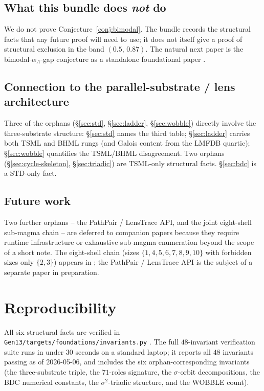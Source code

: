 \documentclass[11pt,reqno]{amsart}
\theoremstyle{plain}
\theoremstyle{definition}
\theoremstyle{remark}
\newcommand{\TSML}{\mathrm{TSML}}
\newcommand{\STD}{\mathrm{STD}}
\begin{document}
\subsection{What this bundle does \emph{not} do}
We do not prove Conjecture~\ref{conj:bimodal}. The bundle records the
structural facts that any future proof will need to use; it does not
itself give a proof of structural exclusion in the band
$(0.5,\,0.87)$. The natural next paper is the
bimodal-$\alpha_A$-gap conjecture as a standalone foundational paper
\cite{FamilyStructureV1}.

\subsection{Connection to the parallel-substrate / lens architecture}
Three of the orphans (\S\ref{sec:std}, \S\ref{sec:ladder},
\S\ref{sec:wobble}) directly involve the three-substrate structure:
\S\ref{sec:std} names the third table; \S\ref{sec:ladder} carries
both TSML and BHML rungs (and Galois content from the LMFDB
quartic); \S\ref{sec:wobble} quantifies the TSML/BHML disagreement.
Two orphans (\S\ref{sec:cycle-skeleton}, \S\ref{sec:triadic}) are
$\TSML$-only structural facts. \S\ref{sec:bdc} is a $\STD$-only
fact.

\subsection{Future work}
Two further orphans -- the PathPair / LensTrace API, and the
joint eight-shell sub-magma chain -- are deferred to companion
papers because they require runtime infrastructure or exhaustive
sub-magma enumeration beyond the scope of a short note. The
eight-shell chain (sizes $\{1,4,5,6,7,8,9,10\}$ with forbidden sizes
only $\{2,3\}$) appears in \cite{SandersGishFourCore}; the
PathPair / LensTrace API is the subject of a separate paper in
preparation.

\section{Reproducibility}\label{sec:repro}

All six structural facts are verified in
\texttt{Gen13/targets/foundations/invariants.py}
\cite{FoundationsModule}. The full $48$-invariant verification suite
runs in under $30$ seconds on a standard laptop; it reports all $48$
invariants passing as of 2026-05-06, and includes the six
orphan-corresponding invariants (the three-substrate triple, the
$71$-roles signature, the $\sigma$-orbit decompositions, the BDC
numerical constants, the $\sigma^2$-triadic structure, and the
WOBBLE count).
\end{document}
